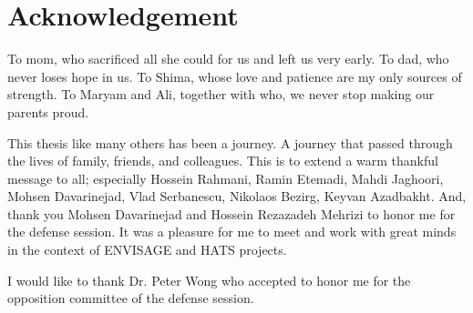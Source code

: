 %
\chapter*{Acknowledgement}
\label{sec:acknowledgement}
\vspace*{-10mm}

To mom, who sacrificed all she could for us and left us very early.
To dad, who never loses hope in us.
To Shima, whose love and patience are my only sources of strength.
To Maryam and Ali, together with who, we never stop making our parents proud.

This thesis like many others has been a journey.
A journey that passed through the lives of family, friends, and colleagues.
This is to extend a warm thankful message to all; especially
Hossein Rahmani, Ramin Etemadi, Mahdi Jaghoori, Mohsen Davarinejad,
Vlad Serbanescu, Nikolaos Bezirg, Keyvan Azadbakht.
And, thank you Mohsen Davarinejad and Hossein Rezazadeh Mehrizi to honor 
me for the defense session.
It was a pleasure for me to meet and work with great minds in the context of
ENVISAGE and HATS projects.

I would like to thank Dr. Peter Wong who accepted to honor me for the opposition
committee of the defense session.
